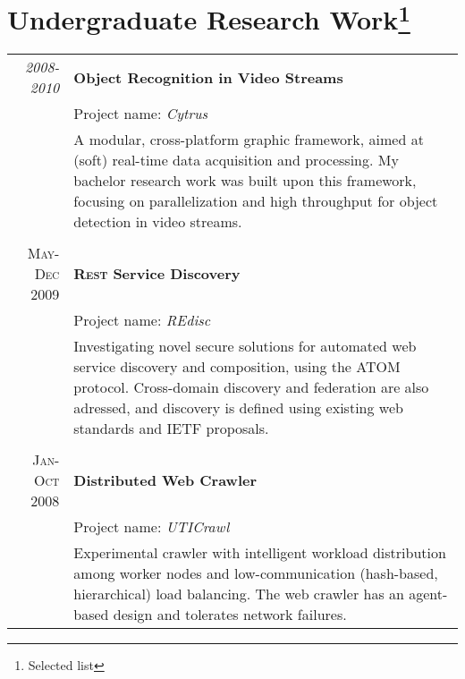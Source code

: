 \documentclass[a4paper,11pt]{article}
\begin{document}
\thispagestyle{fancy}

\section[Undergraduate Research Work]{Undergraduate Research Work\small{\protect\footnote{ Selected list}}}
\begin{longtable}{r|p{11cm}}
 \emph{2008-2010} & {\bf Object Recognition in Video Streams}\\&Project name: \emph{Cytrus} \\&\small{A modular, cross-platform graphic framework, aimed at (soft) real-time data acquisition and processing. My bachelor research work was built upon this framework, focusing on parallelization and high throughput for object detection in video streams.}\\\multicolumn{2}{c}{} \\

\textsc{May-Dec 2009} &  {\bf\textsc{Rest} Service Discovery} \\& Project name: \emph{REdisc}\\&\small{Investigating novel secure solutions for automated web service discovery and composition, using the ATOM protocol. Cross-domain discovery and federation are also adressed, and discovery is defined using existing web standards and IETF proposals.}\\\multicolumn{2}{c}{} \\

\textsc{Jan-Oct 2008} &  {\bf Distributed Web Crawler} \\& Project name: \emph{UTICrawl}\\&\small{Experimental crawler with intelligent workload distribution among worker nodes and low-communication (hash-based, hierarchical) load balancing. The web crawler has an agent-based design and tolerates network failures.}\\

\end{longtable}
\end{document}

